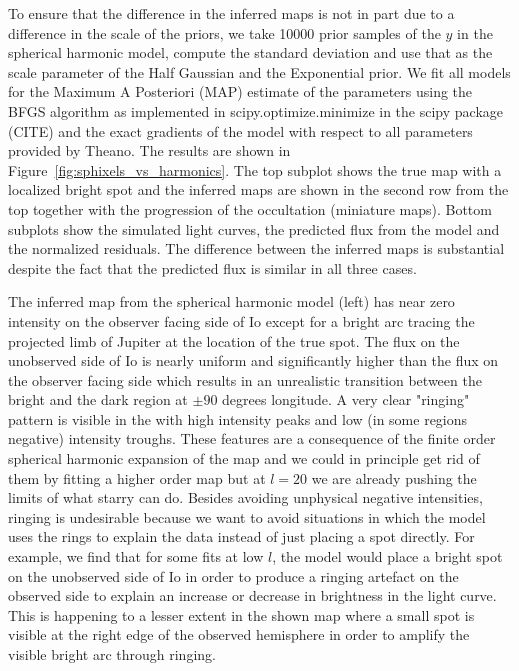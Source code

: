 \documentclass[modern]{aastex62}
\begin{document}
To ensure that the difference in the inferred maps is not in part due to a difference in the scale of the priors, we take 10000 prior samples of the $y$ in the spherical harmonic model, compute the standard deviation and use that as the scale parameter of the Half Gaussian and the Exponential prior.
We fit all models for the Maximum A Posteriori (MAP) estimate of the parameters using the
\textsf{BFGS} algorithm as implemented in \textsf{scipy.optimize.minimize} in the \textsf{scipy} package (CITE) and the exact gradients of the model with respect to all parameters provided by \textsf{Theano}. 
The results are shown in Figure~\ref{fig:sphixels_vs_harmonics}.
The top subplot shows the true map with a localized bright spot and the 
inferred maps are shown in the second row from the top together with the progression of the occultation (miniature maps). 
Bottom subplots show the simulated light curves, the predicted flux from the model and the normalized residuals.
The difference between the inferred maps is substantial despite the fact that the predicted flux is similar in all three cases.

The inferred map from the spherical harmonic model (left) has near zero intensity on the observer facing side of Io except for a bright arc tracing the projected limb of Jupiter at the location of the true spot.
The flux on the unobserved side of Io is nearly uniform and significantly higher than the flux on the observer facing side which results in an unrealistic transition between the bright and the dark region at $\pm 90$ degrees longitude. 
A very clear "ringing" pattern is visible in the with high intensity peaks and low (in some regions negative) intensity troughs.
These features are a consequence of the finite order spherical harmonic expansion of the map and we could in principle get rid of them by fitting a higher order map but at $l=20$ we are already pushing the limits of what \textsf{starry} can do.
Besides avoiding unphysical negative intensities, ringing is undesirable because we want to avoid situations in which the model uses the rings to explain the data instead of just placing a spot directly. 
For example, we find that for some fits at low $l$, the model would place a bright spot on the unobserved side of Io in order to produce a ringing artefact on the observed side to explain an increase or decrease in brightness in the light curve. 
This is happening to a lesser extent in the shown map where a small spot is visible at the right edge of the observed hemisphere in order to amplify the visible bright arc through ringing.
\end{document}
